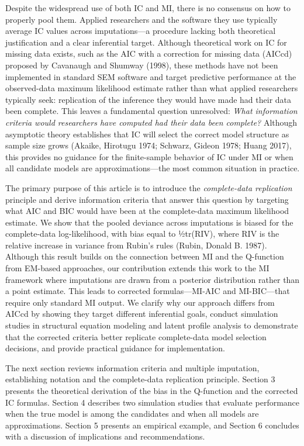 \documentclass[
]{article}
\begin{document}
Despite the widespread use of both IC and MI, there is no consensus on
how to properly pool them. Applied researchers and the software they use
typically average IC values across imputations---a procedure lacking
both theoretical justification and a clear inferential target. Although
theoretical work on IC for missing data exists, such as the AIC with a
correction for missing data (AICcd) proposed by Cavanaugh and Shumway
(1998), these methods have not been implemented in standard SEM software
and target predictive performance at the observed-data maximum
likelihood estimate rather than what applied researchers typically seek:
replication of the inference they would have made had their data been
complete. This leaves a fundamental question unresolved: \emph{What
information criteria would researchers have computed had their data been
complete?} Although asymptotic theory establishes that IC will select
the correct model structure as sample size grows (Akaike, Hirotugu 1974;
Schwarz, Gideon 1978; Huang 2017), this provides no guidance for the
finite-sample behavior of IC under MI or when all candidate models are
approximations---the most common situation in practice.

The primary purpose of this article is to introduce the
\emph{complete-data replication} principle and derive information
criteria that answer this question by targeting what AIC and BIC would
have been at the complete-data maximum likelihood estimate. We show that
the pooled deviance across imputations is biased for the complete-data
log-likelihood, with bias equal to ½tr(RIV), where RIV is the relative
increase in variance from Rubin's rules (Rubin, Donald B. 1987).
Although this result builds on the connection between MI and the
Q-function from EM-based approaches, our contribution extends this work
to the MI framework where imputations are drawn from a posterior
distribution rather than a point estimate. This leads to corrected
formulas---MI-AIC and MI-BIC---that require only standard MI output. We
clarify why our approach differs from AICcd by showing they target
different inferential goals, conduct simulation studies in structural
equation modeling and latent profile analysis to demonstrate that the
corrected criteria better replicate complete-data model selection
decisions, and provide practical guidance for implementation.

The next section reviews information criteria and multiple imputation,
establishing notation and the complete-data replication principle.
Section 3 presents the theoretical derivation of the bias in the
Q-function and the corrected IC formulas. Section 4 describes two
simulation studies that evaluate performance when the true model is
among the candidates and when all models are approximations. Section 5
presents an empirical example, and Section 6 concludes with a discussion
of implications and recommendations.
\end{document}
